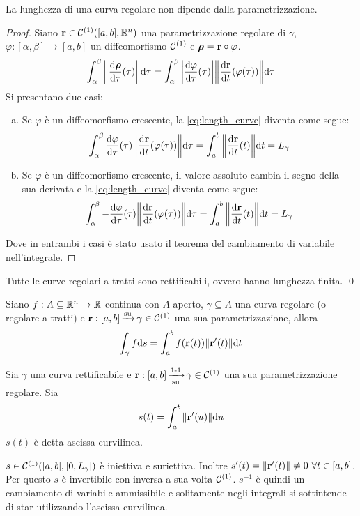 \begin{prop}\label{prop:length_invariance}
	La lunghezza di una curva regolare non dipende dalla parametrizzazione.
\end{prop}

\begin{proof}
	Siano $\vb{r}\in\mathcal{C}^{(1)}([a,b],\mathbb{R}^n)$ una parametrizzazione regolare di $\gamma$, $\varphi:[\alpha,\beta]\to[a,b]$ un diffeomorfismo $\mathcal{C}^{(1)}$ e $\bm{\rho}=\vb{r}\circ\varphi$.
	\begin{equation}\label{eq:length_curve}
		\int_{\alpha}^{\beta}\norm{\frac{\dd \bm\rho}{\dd \tau}(\tau)}\dd \tau
		=\int_{\alpha}^{\beta}\abs{\frac{\dd \varphi}{\dd \tau}(\tau)}\norm{\frac{\dd \vb{r}}{\dd t}(\varphi(\tau))}\dd \tau
	\end{equation}
	Si presentano due casi:
	\begin{enumerate}[a.]
		\item Se $\varphi$ è un diffeomorfismo crescente, la \eqref{eq:length_curve} diventa come segue:
		$$
			\int_{\alpha}^{\beta}\frac{\dd \varphi}{\dd \tau}(\tau)\norm{\frac{\dd \vb{r}}{\dd t}(\varphi(\tau))}\dd \tau=\int_{a}^{b}\norm{\frac{\dd \vb{r}}{\dd t}(t)}\dd t=L_\gamma
		$$
		\item Se $\varphi$ è un diffeomorfismo crescente, il valore assoluto cambia il segno della sua derivata e la \eqref{eq:length_curve} diventa come segue:
		$$
		\int_{\alpha}^{\beta}-\frac{\dd \varphi}{\dd \tau}(\tau)\norm{\frac{\dd \vb{r}}{\dd t}(\varphi(\tau))}\dd \tau=\int_{a}^{b}\norm{\frac{\dd \vb{r}}{\dd t}(t)}\dd t=L_\gamma
		$$
	\end{enumerate}
	Dove in entrambi i casi è stato usato il teorema del cambiamento di variabile nell'integrale.
\end{proof}

\begin{prop}
	Tutte le curve regolari a tratti sono rettificabili, ovvero hanno lunghezza finita.
	\qed
\end{prop}

\begin{definition}
	Siano $f: A\subseteq\mathbb{R}^n \to \mathbb{R}$ continua con $A$ aperto, $\gamma \subseteq A$ una curva regolare (o regolare a tratti) e $\vb{r}:[a,b]\operatorname{\xrightarrow{\operatorname{su}}} \gamma \in \mathcal{C}^{(1)}$ una sua parametrizzazione, allora
	$$
		\int_\gamma f \dd s = \int_a^b f(\vb{r}(t))\norm{\vb{r}'(t)}\dd t
	$$
\end{definition}

\begin{definition}
	Sia $\gamma$ una curva rettificabile e $\vb{r}:[a,b]\operatorname{\xrightarrow[\operatorname{su}]{\operatorname{1-1}}}\gamma \in \mathcal{C}^{(1)}$ una sua parametrizzazione regolare. Sia
	$$
		s(t)=\int_a^t\norm{\vb{r}'(u)}\dd u
	$$
	$s(t)$ è detta ascissa curvilinea.
\end{definition}
$s\in\mathcal{C}^{(1)}([a,b],[0,L_\gamma])$ è iniettiva e suriettiva. Inoltre $s'(t)=\norm{\vb{r}'(t)}\neq0 \ \forall t \in [a,b]$. Per questo $s$ è invertibile con inversa a sua volta $\mathcal{C}^{(1)}$. $s^{-1}$ è quindi un cambiamento di variabile ammissibile e solitamente negli integrali si sottintende di star utilizzando l'ascissa curvilinea.

